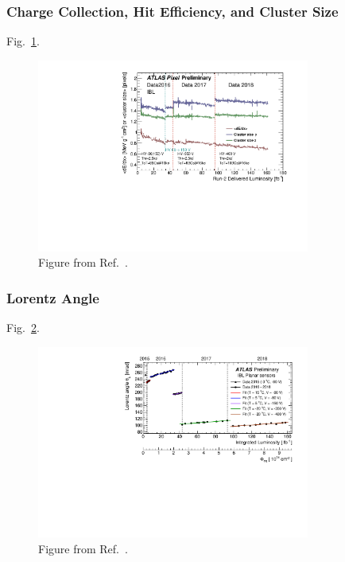 \subsubsection{Charge Collection, Hit Efficiency, and Cluster Size}

Fig.~\ref{lab:sensormeasurements:CCE:ATLAS1}.

\begin{figure}[h!]
\centering
\includegraphics[width=0.8\textwidth]{figures/SensorMeasurements/ChargeCollection/fig_02.pdf}
\caption{Figure from Ref.~\cite{ATL-PIX-2018-011}.}
\label{lab:sensormeasurements:CCE:ATLAS1}
\end{figure}

\subsubsection{Lorentz Angle}

Fig.~\ref{lab:sensormeasurements:Lorentz:ATLAS1}.

\begin{figure}[h!]
\centering
\includegraphics[width=0.8\textwidth]{figures/SensorMeasurements/LorentzAngle/fig_13}
\caption{Figure from Ref.~\cite{ATL-PIX-2017-005}.}
\label{lab:sensormeasurements:Lorentz:ATLAS1}
\end{figure}

